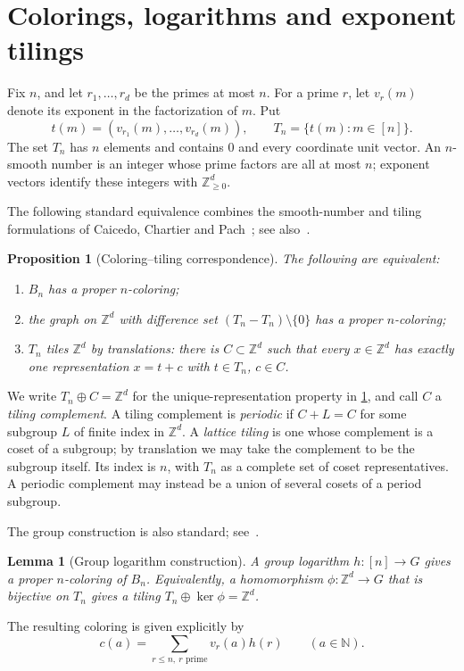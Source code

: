 \documentclass[11pt,reqno]{amsart}
\newcommand{\N}{\mathbb N}
\newcommand{\Z}{\mathbb Z}
\newtheorem{proposition}[theorem]{Proposition}
\newtheorem{lemma}[theorem]{Lemma}
\theoremstyle{definition}
\theoremstyle{remark}
\numberwithin{equation}{section}
\begin{document}
\section{Colorings, logarithms and exponent tilings}\label{sec:tiling}
Fix $n$, and let $r_1,\ldots,r_d$ be the primes at most $n$.
For a prime $r$, let $v_r(m)$ denote its exponent in the factorization
of $m$. Put
\[
 t(m)=(v_{r_1}(m),\ldots,v_{r_d}(m)),\qquad
 T_n=\{t(m):m\in[n]\}.
\]
The set $T_n$ has $n$ elements and contains $0$ and every coordinate unit vector.
An $n$-smooth number is an integer whose prime factors are all at most $n$; exponent vectors identify these integers with $\Z_{\ge0}^d$.

The following standard equivalence combines the smooth-number and tiling formulations of Caicedo, Chartier and Pach~\cite[Propositions~19, 25 and~26]{CCP}; see also~\cite{Bosek}.
\begin{samepage}
\begin{proposition}[Coloring--tiling correspondence]\label{prop:tiling}
The following are equivalent:
\begin{enumerate}
\renewcommand{\theenumi}{\roman{enumi}}
\renewcommand{\labelenumi}{\textup{(\theenumi)}}
\item $B_n$ has a proper $n$-coloring;
\item the graph on $\Z^d$ with difference set $(T_n-T_n)\setminus\{0\}$ has a proper $n$-coloring;
\item $T_n$ tiles $\Z^d$ by translations: there is $C\subset\Z^d$ such that every $x\in\Z^d$ has exactly one representation $x=t+c$ with $t\in T_n$, $c\in C$.
\end{enumerate}
\end{proposition}
\end{samepage}

We write $T_n\oplus C=\Z^d$ for the unique-representation property in
\cref{prop:tiling}, and call $C$ a \emph{tiling complement}.
A tiling complement is \emph{periodic} if $C+L=C$ for some subgroup
$L$ of finite index in $\Z^d$. A \emph{lattice tiling} is one whose
complement is a coset of a subgroup; by translation we may take the
complement to be the subgroup itself. Its index is $n$, with $T_n$ as
a complete set of coset representatives. A periodic complement may
instead be a union of several cosets of a period subgroup.

The group construction is also standard; see~\cite[Theorem~61 and Lemma~74]{CCP}.
\begin{lemma}[Group logarithm construction]\label{lem:group}
A group logarithm $h:[n]\to G$ gives a proper $n$-coloring of $B_n$.
Equivalently, a homomorphism $\phi:\Z^d\to G$ that is bijective on $T_n$ gives a tiling $T_n\oplus\ker\phi=\Z^d$.
\end{lemma}
The resulting coloring is given explicitly by
\[
 c(a)=\sum_{r\le n,\ r\text{ prime}}v_r(a)h(r)\qquad(a\in\N).
\]
\end{document}
